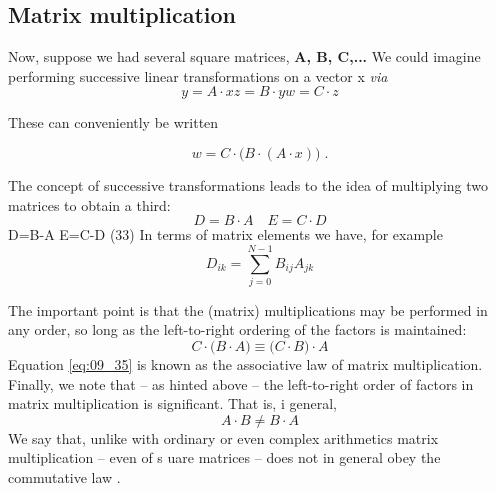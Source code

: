 \subsection{Matrix multiplication}

Now, suppose we had several square matrices, \textbf{A, B, C,...} We
could imagine performing successive linear transformations on a
vector x \textit{via}
\begin{subequations}
    \begin{equation}
        \label{eq:09_31a}
        y= A \cdot x%
    \end{equation}
    \begin{equation}
        \label{eq:09_31b}
        z= B \cdot y %
    \end{equation}
    \begin{equation}
        \label{eq:09_31c}
        w = C \cdot z  %
    \end{equation}
\end{subequations}

These can conveniently be written

\begin{equation}
    \label{eq:09_32}
    w=C \cdot \Big( B \cdot (A \cdot x) \Big) \; .%
\end{equation}

The concept of successive transformations leads to the idea of
multiplying two matrices to obtain a third:
\begin{equation}
    \label{eq:09_33}
    D = B \cdot A \quad E = C \cdot D
\end{equation}
D=B-A E=C-D (33)
In terms of matrix elements we have, for example
\begin{equation}
    \label{eq:09_34}
    D_{ik} = \sum_{j=0}^{N-1} B_{ij} A_{jk}
\end{equation}

The important point is that the (matrix) multiplications may be
performed in any order, so long as the left-to-right ordering of
the factors is maintained:
\begin{equation}
    \label{eq:09_35}
    C \cdot \big( B \cdot A \big) \equiv \big( C \cdot B \big) \cdot A
\end{equation}
Equation \ref{eq:09_35} is known as the associative law of matrix
multiplication. Finally, we note that -- as hinted above -- the left-to-right
order of factors in matrix multiplication is significant. That is, i
general,
\begin{equation}
    \label{eq:09_36}
    A \cdot B \neq B \cdot A
\end{equation}
We say that, unlike with ordinary or even complex arithmetics
matrix multiplication -- even of s uare matrices -- does not in
general obey the commutative law .

